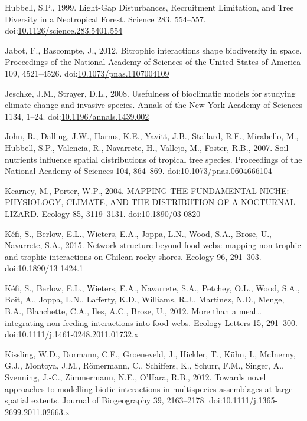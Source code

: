 \hypertarget{ref-Hubbell1999}{}
Hubbell, S.P., 1999. Light-Gap Disturbances, Recruitment Limitation, and
Tree Diversity in a Neotropical Forest. Science 283, 554--557.
doi:\href{https://doi.org/10.1126/science.283.5401.554}{10.1126/science.283.5401.554}

\hypertarget{ref-Jabot2012}{}
Jabot, F., Bascompte, J., 2012. Bitrophic interactions shape
biodiversity in space. Proceedings of the National Academy of Sciences
of the United States of America 109, 4521--4526.
doi:\href{https://doi.org/10.1073/pnas.1107004109}{10.1073/pnas.1107004109}

\hypertarget{ref-Jeschke2008}{}
Jeschke, J.M., Strayer, D.L., 2008. Usefulness of bioclimatic models for
studying climate change and invasive species. Annals of the New York
Academy of Sciences 1134, 1--24.
doi:\href{https://doi.org/10.1196/annals.1439.002}{10.1196/annals.1439.002}

\hypertarget{ref-John2007}{}
John, R., Dalling, J.W., Harms, K.E., Yavitt, J.B., Stallard, R.F.,
Mirabello, M., Hubbell, S.P., Valencia, R., Navarrete, H., Vallejo, M.,
Foster, R.B., 2007. Soil nutrients influence spatial distributions of
tropical tree species. Proceedings of the National Academy of Sciences
104, 864--869.
doi:\href{https://doi.org/10.1073/pnas.0604666104}{10.1073/pnas.0604666104}

\hypertarget{ref-Kearney2004}{}
Kearney, M., Porter, W.P., 2004. MAPPING THE FUNDAMENTAL NICHE:
PHYSIOLOGY, CLIMATE, AND THE DISTRIBUTION OF A NOCTURNAL LIZARD. Ecology
85, 3119--3131.
doi:\href{https://doi.org/10.1890/03-0820}{10.1890/03-0820}

\hypertarget{ref-Kefi2015}{}
Kéfi, S., Berlow, E.L., Wieters, E.A., Joppa, L.N., Wood, S.A., Brose,
U., Navarrete, S.A., 2015. Network structure beyond food webs: mapping
non-trophic and trophic interactions on Chilean rocky shores. Ecology
96, 291--303.
doi:\href{https://doi.org/10.1890/13-1424.1}{10.1890/13-1424.1}

\hypertarget{ref-Kefi2012}{}
Kéfi, S., Berlow, E.L., Wieters, E.A., Navarrete, S.A., Petchey, O.L.,
Wood, S.A., Boit, A., Joppa, L.N., Lafferty, K.D., Williams, R.J.,
Martinez, N.D., Menge, B.A., Blanchette, C.A., Iles, A.C., Brose, U.,
2012. More than a meal\ldots{} integrating non-feeding interactions into
food webs. Ecology Letters 15, 291--300.
doi:\href{https://doi.org/10.1111/j.1461-0248.2011.01732.x}{10.1111/j.1461-0248.2011.01732.x}

\hypertarget{ref-Kissling2011}{}
Kissling, W.D., Dormann, C.F., Groeneveld, J., Hickler, T., Kühn, I.,
McInerny, G.J., Montoya, J.M., Römermann, C., Schiffers, K., Schurr,
F.M., Singer, A., Svenning, J.-C., Zimmermann, N.E., O'Hara, R.B., 2012.
Towards novel approaches to modelling biotic interactions in
multispecies assemblages at large spatial extents. Journal of
Biogeography 39, 2163--2178.
doi:\href{https://doi.org/10.1111/j.1365-2699.2011.02663.x}{10.1111/j.1365-2699.2011.02663.x}

